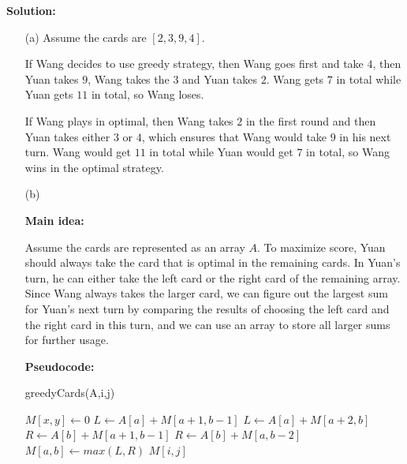 \documentclass{article}
\begin{document}
{\color{blue}
\par\textbf{Solution: }
\begin{enumerate}
	\item[(a)] Assume the cards are $[2,3,9,4]$. 
		\par If Wang decides to use greedy strategy, then Wang goes first and take $4$, then Yuan takes $9$, Wang takes the $3$ and Yuan takes $2$. Wang gets $7$ in total while Yuan gets $11$ in total, so Wang loses. 
		\par If Wang plays in optimal, then Wang takes $2$ in the first round and then Yuan takes either $3$ or $4$, which ensures that Wang would take $9$ in his next turn. Wang would get $11$ in total while Yuan would get $7$ in total, so Wang wins in the optimal strategy.
	
	\item[(b)] \par\textbf{Main idea: }
	\par Assume the cards are represented as an array $A$. To maximize score, Yuan should always take the card that is optimal in the remaining cards. In Yuan's turn, he can either take the left card or the right card of the remaining array. Since Wang always takes the larger card, we can figure out the largest sum for Yuan's next turn by comparing the results of choosing the left card and the right card in this turn, and we can use an array to store all larger sums for further usage.
		
		\pagebreak
		\par\textbf{Pseudocode: }
		\begin{algorithm}
			\caption{greedyCards(A,i,j)}
			\label{alg2}
			\color{blue}
			\begin{algorithmic}
					\STATE $M[x, y] \gets 0$
				\ENDWHILE
						\STATE $L \gets A[a] + M[a+1, b-1]$
					\ELSE
						\STATE $L \gets A[a] + M[a+2, b]$
					\ENDIF
						\STATE $R \gets A[b] + M[a+1, b-1]$
					\ELSE
						\STATE $R \gets A[b] + M[a, b-2]$
					\ENDIF
					\STATE $M[a,b] \gets max(L, R)$
				\ENDWHILE
				\RETURN $M[i,j]$
			\end{algorithmic}
		\end{algorithm}
		

\end{enumerate}}
\end{document}
